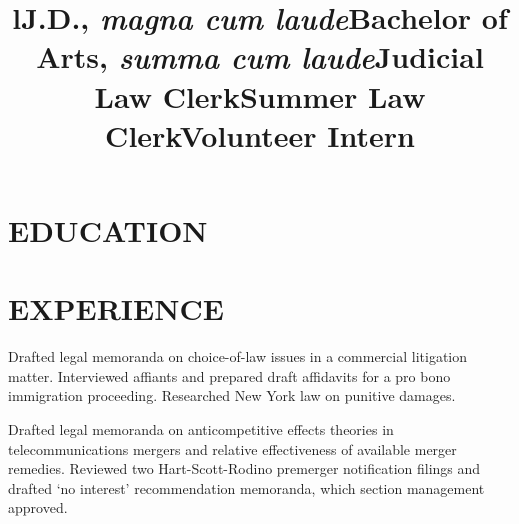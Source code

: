 \documentclass{res}
\title{l}\dates{r}\\
\begin{document}

\address{8 Douglass St. \#3F\\Cambridge, MA 02139}
\address{dylan@herts.io \\ (216) 288-2768}

\begin{resume}

\section{EDUCATION}
        \title{J.D., \textit{magna cum laude}}
        \begin{position}
        \end{position}

        \title{Bachelor of Arts, \textit{summa cum laude}}
        \begin{position}
        \end{position}

\section{EXPERIENCE}
    \title{Judicial Law Clerk}
    \begin{position}
    \end{position}

    \title{Summer Law Clerk}
    \begin{position}
        Drafted legal memoranda on choice-of-law issues in a commercial litigation matter. Interviewed affiants and prepared draft affidavits for a pro bono immigration proceeding. Researched New York law on punitive damages.
    \end{position}

    \title{Volunteer Intern}
    \begin{position}
        Drafted legal memoranda on anticompetitive effects theories in telecommunications mergers and relative effectiveness of available merger remedies. Reviewed two Hart-Scott-Rodino premerger notification filings and drafted ‘no interest’ recommendation memoranda, which section management approved.
    \end{position}


\end{resume}
\end{document}
